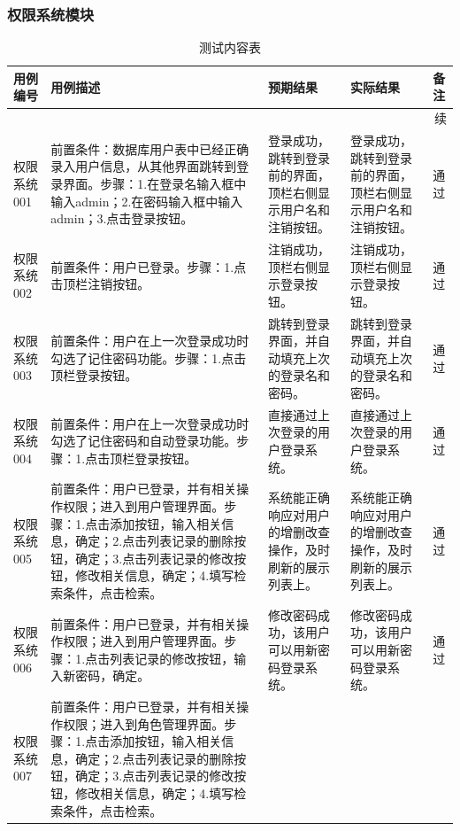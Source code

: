 \documentclass[titlepage,UTF8,linespread=1.5]{ctexart}
\begin{document}
\subsubsection{权限系统模块}
\begin{longtable}{|p{4em}|p{14em}|p{7em}|p{7em}|p{2em}|}
    \caption{测试内容表}\label{tab:test_auth}  \\\hline
    用例编号    & 用例描述 & 预期结果 & 实际结果 & 备注 \\\hline
    \endfirsthead
    \multicolumn{5}{r}{{续\tablename\thetable{}}}       \\\hline
    \endhead
    权限系统001 &
    前置条件：数据库用户表中已经正确录入用户信息，从其他界面跳转到登录界面。步骤：1.在登录名输入框中输入admin；2.在密码输入框中输入admin；3.点击登录按钮。 &
    登录成功，跳转到登录前的界面，顶栏右侧显示用户名和注销按钮。 &
    登录成功，跳转到登录前的界面，顶栏右侧显示用户名和注销按钮。 &
    通过 \\\hline
    权限系统002 &
    前置条件：用户已登录。步骤：1.点击顶栏注销按钮。 &
    注销成功，顶栏右侧显示登录按钮。 &
    注销成功，顶栏右侧显示登录按钮。 &
    通过 \\\hline
    权限系统003 &
    前置条件：用户在上一次登录成功时勾选了记住密码功能。步骤：1.点击顶栏登录按钮。 &
    跳转到登录界面，并自动填充上次的登录名和密码。 &
    跳转到登录界面，并自动填充上次的登录名和密码。 &
    通过 \\\hline
    权限系统004 &
    前置条件：用户在上一次登录成功时勾选了记住密码和自动登录功能。步骤：1.点击顶栏登录按钮。 &
    直接通过上次登录的用户登录系统。 &
    直接通过上次登录的用户登录系统。 &
    通过 \\\hline
    权限系统005 &
    前置条件：用户已登录，并有相关操作权限；进入到用户管理界面。步骤：1.点击添加按钮，输入相关信息，确定；2.点击列表记录的删除按钮，确定；3.点击列表记录的修改按钮，修改相关信息，确定；4.填写检索条件，点击检索。 &
    系统能正确响应对用户的增删改查操作，及时刷新的展示列表上。 &
    系统能正确响应对用户的增删改查操作，及时刷新的展示列表上。 &
    通过 \\\hline
    权限系统006 &
    前置条件：用户已登录，并有相关操作权限；进入到用户管理界面。步骤：1.点击列表记录的修改按钮，输入新密码，确定。 &
    修改密码成功，该用户可以用新密码登录系统。 &
    修改密码成功，该用户可以用新密码登录系统。 &
    通过 \\\hline
    权限系统007 &
    前置条件：用户已登录，并有相关操作权限；进入到角色管理界面。步骤：1.点击添加按钮，输入相关信息，确定；2.点击列表记录的删除按钮，确定；3.点击列表记录的修改按钮，修改相关信息，确定；4.填写检索条件，点击检索。 &

\end{longtable}
\end{document}
